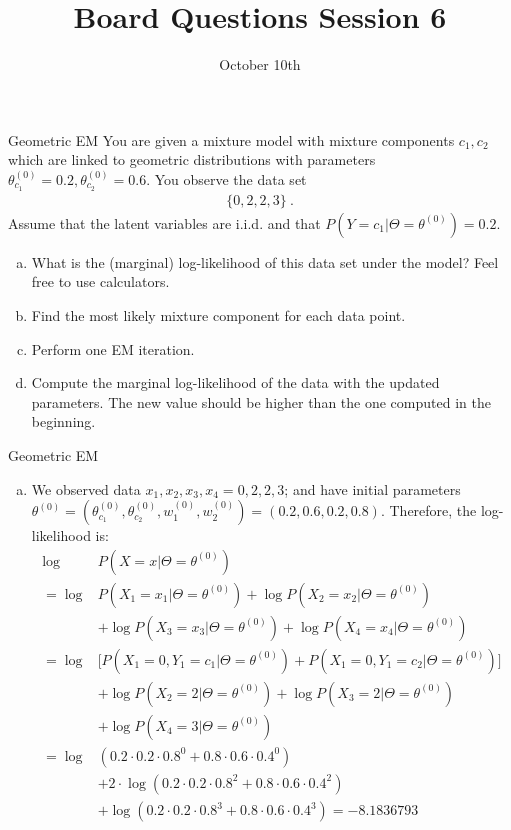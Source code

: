 \documentclass{beamer}\usepackage[]{graphicx}\usepackage[]{color}
\title{Board Questions Session 6}
\date{October 10th}
\begin{document}
\begin{frame}{Geometric EM}
\small
You are given a mixture model with mixture components $ c_{1},c_{2} $ which are linked to geometric
distributions with parameters $ \theta^{(0)}_{c_{1}} = 0.2, \theta^{(0)}_{c_{2}} = 0.6 $. You
observe the data set
\begin{align*}
\{0, 2, 2, 3\} \ .
\end{align*}
Assume that the latent variables are i.i.d. and that $ P(Y=c_{1}|\Theta=\theta^{(0)}) = 0.2 $.
\begin{enumerate}[a)]
\item What is the (marginal) log-likelihood of this data set under the model? Feel free to use
calculators.
\item Find the most likely mixture component for each data point.
\item Perform one EM iteration.
\item Compute the marginal log-likelihood of the data with the updated parameters. The new value
should be higher than the one computed in the beginning.
\end{enumerate}
\end{frame}

\begin{frame}{Geometric EM}
\small
\begin{enumerate}[a)] 
\item We observed data $x_1, x_2, x_3, x_4 = 0, 2, 2, 3$; and have
  initial parameters
  $\theta^{(0)} = (\theta_{c_1}^{(0)}, \theta_{c_2}^{(0)},
  w_1^{(0)},w_2^{(0)}) = (0.2, 0.6, 0.2, 0.8)$. Therefore,
  the log-likelihood is: 
 \begin{align*}
  \log &P(X=x | \Theta=\theta^{(0)})\\
  = \log & P(X_1 = x_1 | \Theta=\theta^{(0)}) +  \log P(X_2 = x_2 |
        \Theta=\theta^{(0)})\\ 
        &+ \log P(X_3 = x_3 |
        \Theta=\theta^{(0)}) + \log P(X_4 = x_4 |
        \Theta=\theta^{(0)}) \\
   =\log &\big[P(X_1 = 0,Y_1=c_1 | \Theta=\theta^{(0)}) + P(X_1 =
          0,Y_1=c_2 | \Theta=\theta^{(0)}) \big]\\  
    &+\log P(X_2 = 2 |
        \Theta=\theta^{(0)}) + \log P(X_3 = 2 |
        \Theta=\theta^{(0)})\\ 
        &+ \log P(X_4 = 3 |
        \Theta=\theta^{(0)}) \\        
=\log&(0.2\cdot 0.2\cdot 0.8^{0} + 0.8 \cdot 0.6 \cdot 0.4^{0}) \\
&+ 2\cdot \log(0.2\cdot 0.2 \cdot 0.8^{2} + 0.8\cdot 0.6 \cdot 0.4^{2}) \\
&+ \log(0.2\cdot 0.2 \cdot 0.8^{3} + 0.8\cdot 0.6 \cdot 0.4^{3})
= \ensuremath{-8.1836793}
\end{align*}
\end{enumerate}
\end{frame}
\end{document}

